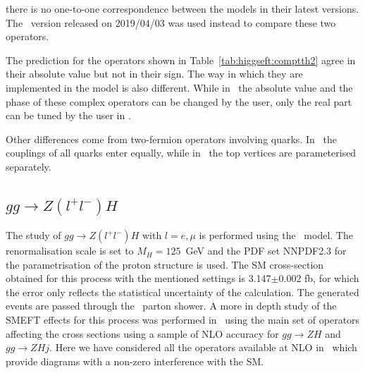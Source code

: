    there is no one-to-one correspondence between the models in their latest versions. The \SMEFTatNLO\ version released on 2019/04/03 was used instead to compare these two operators.
\begin{center}
  \begin{table}[h!]
    \caption{ Comparison of the SM and interference predictions for the $pp\to t\bar{t} H$ process between the \SMEFTsim\ and \SMEFTatNLO\ for \ctB\ (\cuBAbs) and \ctW\ (\cuWAbs). The operator definition are given in the way they are implemented in \SMEFTatNLO\ .}
    \label{tab:higgseft:comptth2}
\end{table}
\end{center}
The prediction for the operators shown in Table~\ref{tab:higgseft:comptth2} agree in their absolute value but not in their sign. The way in which they are implemented in the model is also different. While in \SMEFTsim\ the absolute value and the phase of these complex operators can be changed by the user, only the real part can be tuned by the user in \SMEFTatNLO.

Other differences come from two-fermion operators involving quarks. In \SMEFTsim\ the couplings of all quarks enter equally, while in \SMEFTatNLO\ the top vertices are parameterised separately. 


\subsection{$gg\to Z(l^{+}l^{-})H$}
\label{sec:higgseft:ggzh}
The study of  $gg\to Z(l^{+}l^{-})H$ with $l=e,\mu$ is performed using the \SMEFTatNLO\ model. The renormalisation scale is set to $M_H=125$~GeV and the PDF set NNPDF2.3 for the parametrisation of the proton structure is used. The SM cross-section obtained for this process with the mentioned settings is 3.147$\pm$0.002 fb, for which the error only reflects the statistical uncertainty of the calculation. The generated events are passed through the \Pythia\ parton shower. A more in depth study of the SMEFT effects for this process was performed in~\cite{Bylund:2016phk} using the main set of operators affecting the cross sections using a sample of NLO accuracy for $gg\to ZH$ and $gg\to ZHj$. Here we have considered all the operators available at NLO in \SMEFTatNLO\ which provide diagrams with a non-zero interference with the SM.

